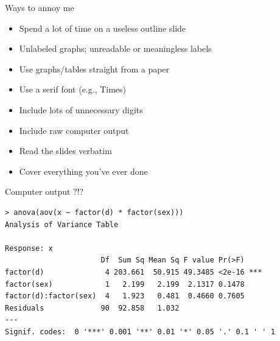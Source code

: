 \documentclass[12pt]{article}
\newcommand{\headsize}{\fontsize{35}{35} \selectfont}
\newcommand{\smallsize}{\fontsize{25}{30} \selectfont}
\newcommand{\smallersize}{\fontsize{20}{25} \selectfont}
\begin{document}
\newpage

\headsize \color{myyellow}
\hfill \begin{minipage}{5.75in}
\centering
Ways to annoy me
\end{minipage}

\vspace{30mm} \color{mywhite} \smallsize

\hfill \begin{minipage}{9.5in}

\begin{itemize}
\itemsep18pt
\color{myblue}
\item Spend a lot of time on a useless outline slide

\item Unlabeled graphs; unreadable or meaningless labels

\item Use graphs/tables straight from a paper

\item Use a serif font (e.g., Times)

\item Include lots of unnecessary digits
\color{mywhite}
\item Include raw computer output
\color{myblue}

\item Read the slides verbatim

\item Cover everything you've ever done

\end{itemize}

\end{minipage}





\newpage

\headsize \color{myyellow}
\hfill \begin{minipage}{5.75in}
\centering
Computer output{\color{mypink} ?!?}
\end{minipage}

\vspace{30mm} \color{mywhite} \smallsize

\hfill \begin{minipage}{9.5in}

\smallersize
\begin{verbatim}
> anova(aov(x ~ factor(d) * factor(sex)))
Analysis of Variance Table

Response: x
                      Df  Sum Sq Mean Sq F value Pr(>F)    
factor(d)              4 203.661  50.915 49.3485 <2e-16 ***
factor(sex)            1   2.199   2.199  2.1317 0.1478    
factor(d):factor(sex)  4   1.923   0.481  0.4660 0.7605    
Residuals             90  92.858   1.032                   
---
Signif. codes:  0 '***' 0.001 '**' 0.01 '*' 0.05 '.' 0.1 ' ' 1 
\end{verbatim}
\end{minipage}
\end{document}
